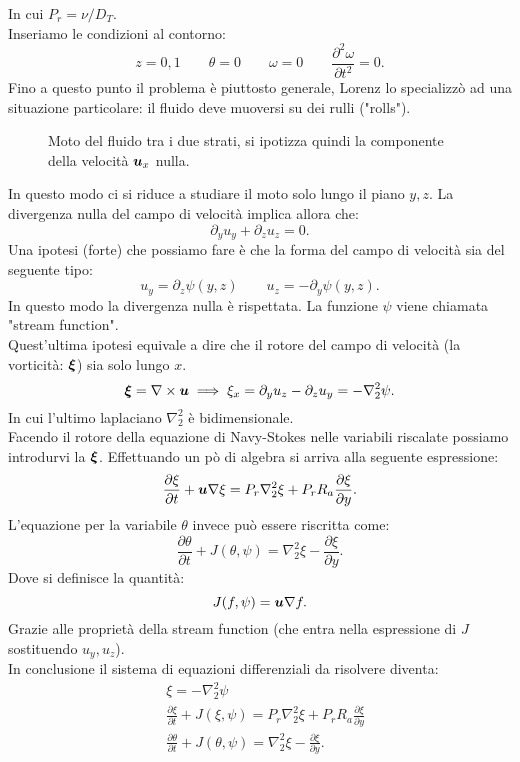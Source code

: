 In cui $P_r = \nu  /D_T$. \\
Inseriamo le condizioni al contorno:
\[
    z = 0, 1 
    \qquad 
    \theta  = 0
    \qquad
    \omega = 0
    \qquad
    \frac{\partial ^2\omega}{\partial t^2}  = 0
.\] 
Fino a questo punto il problema è piuttosto generale, Lorenz lo specializzò ad una situazione particolare: il fluido deve muoversi su dei rulli ("rolls").
\begin{figure}[H]
    \centering
    \caption{\scriptsize Moto del fluido tra i due strati, si ipotizza quindi la componente della velocità $\boldsymbol{u}_x$ nulla.}
    \label{fig:24_rolls}
\end{figure}
In questo modo ci si riduce a studiare il moto solo lungo il piano $y, z$. La divergenza nulla del campo di velocità implica allora che:
\[
    \partial_{y}u_y + \partial_{z}u_z = 0
.\] 
Una ipotesi (forte) che possiamo fare è che la forma del campo di velocità sia del seguente tipo:
\[
    u_y = \partial_{z}\psi (y,z) \qquad u_z = -\partial_{y}\psi (y,z)
.\] 
In questo modo la divergenza nulla è rispettata. La funzione $\psi$  viene chiamata "stream function". \\
Quest'ultima ipotesi equivale a dire che il rotore del campo di velocità (la vorticità: $\boldsymbol{\xi}$) sia solo lungo $x$.
\[
    \boldsymbol{\xi}  = \nabla \times \boldsymbol{u}  \implies  \xi_x = \partial_{y}u_z - \partial_{z}u_y = - \nabla_2^2\psi
.\] 
In cui l'ultimo laplaciano $\nabla^2_2$  è bidimensionale.\\
Facendo il rotore della equazione di Navy-Stokes nelle variabili riscalate possiamo introdurvi la $\boldsymbol{\xi}$. Effettuando un pò di algebra si arriva alla seguente espressione:
\[
    \frac{\partial \xi}{\partial t} + \boldsymbol{u}\nabla \xi = P_r \nabla ^2_2 \xi + P_r R_a \frac{\partial \xi}{\partial y} 
.\] 
L'equazione per la variabile $\theta$  invece può essere riscritta come:
\[
    \frac{\partial \theta}{\partial t}  + J(\theta,\psi) = \nabla _2^2\xi - \frac{\partial \xi}{\partial y} 
.\] 
Dove si definisce la quantità:
\[
    J(f, \psi) = \boldsymbol{u}\nabla f
.\] 
Grazie alle proprietà della stream function (che entra nella espressione di $J$  sostituendo $u_y, u_z$). \\
In conclusione il sistema di equazioni differenziali da risolvere diventa:
\[\begin{aligned}
    & \xi = - \nabla _2^2\psi\\
    & \frac{\partial \xi}{\partial t} + J(\xi, \psi) = P_r \nabla ^2_2 \xi + P_r R_a \frac{\partial \xi}{\partial y} \\
    &\frac{\partial \theta}{\partial t}  + J(\theta,\psi) = \nabla _2^2\xi - \frac{\partial \xi}{\partial y} 
.\end{aligned}\]
